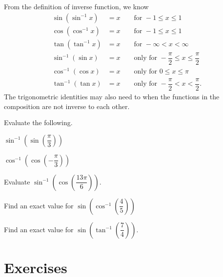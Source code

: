 \begin{howto}
From the definition of inverse function, we know
$$
\begin{aligned} 
  \sin({\sin}^{-1}x)&= x\qquad \text{for } -1\leq x\leq 1\\ 
  \cos({\cos}^{-1}x)&= x\qquad \text{for } -1\leq x\leq 1\\ 
  \tan({\tan}^{-1}x)&= x\qquad \text{for } -\infty<x<\infty\\ 
  {\sin}^{-1}(\sin x)&= x\qquad \text{only for } -\dfrac{\pi}{2}\leq x\leq \dfrac{\pi}{2}\\ 
  {\cos}^{-1}(\cos x)&= x\qquad \text{only for } 0\leq x\leq \pi\\ 
  {\tan}^{-1}(\tan x)& =x\qquad \text{only for } -\dfrac{\pi}{2}< x< \dfrac{\pi}{2}.
\end{aligned}
$$
The trigonometric identities may also need to when the functions in the composition are not inverse to each other.
\end{howto}

\begin{example}
  Evaluate the following.\\
  \begin{enumerate*}
    \item ${\sin}^{-1}\left(\sin \left(\dfrac{\pi}{3}\right)\right)$
    \item ${\cos}^{-1}\left(\cos \left(-\dfrac{\pi}{3}\right)\right)$\hfill\null
  \end{enumerate*}
\end{example}

\newpage

\begin{example}
  Evaluate $\sin^{-1}\left(\cos\left(\dfrac{13\pi}{6}\right)\right)$.
\end{example}

\begin{example}
  Find an exact value for $\sin\left({\cos}^{-1}\left(\dfrac{4}{5}\right)\right)$
\end{example}

\begin{example}
  Find an exact value for $\sin\left({\tan}^{-1}\left(\dfrac{7}{4}\right)\right)$.
\end{example}

\newpage
\section*{Exercises}


